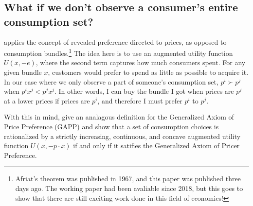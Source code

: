 \begin{description}
\subsection*{What if we don't observe a consumer's entire consumption set?}
\citet{RPPs} applies the concept of revealed preference directed to prices, as opposed to consumption bundles.\footnote{Afriat's theorem was published in 1967, and this paper was published three days ago. The working paper had been avaliable since 2018, but this goes to show that there are still exciting work done in this field of economics!} The idea here is to use an augmented utility function $U(x, -e)$, where the second term captures how much consumers spent. For any given bundle $x$, customers would prefer to spend as little as possible to acquire it. In our case where we only observe a part of someone's consumption set, $p^i \succ p^j$ when $p^ix^j < p^jx^j$. In other words, I can buy the bundle I got when prices are $p^j$ at a lower prices if prices are $p^i$, and therefore I must prefer $p^i$ to $p^j$.

With this in mind, \citet{RPPs} give an analagous definition for the Generalized Axiom of Price Preference (GAPP) and show that a set of consumption choices is rationalized by a strictly increasing, continuous, and concave augmented utility function $U(x, -p \cdot x)$ if and only if it satifies the Generalized Axiom of Pricer Preference.


\end{description}